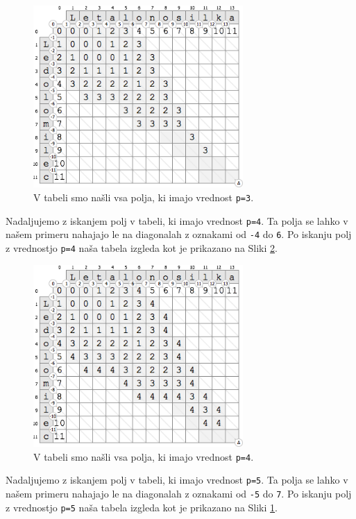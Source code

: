 \documentclass[a4paper, 12pt, twoside]{book}
\begin{document}
\begin{figure}[placement h]
\begin{center}
\includegraphics[width=8cm]{ses6.png}
\end{center}
\caption{V tabeli smo našli vsa polja, ki imajo vrednost {\tt p=3}.}
\label{ses6}
\end{figure}

Nadaljujemo z iskanjem polj v tabeli, ki imajo vrednost {\tt p=4}. Ta polja se lahko v našem primeru nahajajo le na diagonalah z oznakami od {\tt -4} do {\tt 6}. Po iskanju polj z vrednostjo {\tt p=4} naša tabela izgleda kot je prikazano na Sliki \ref{ses7}.

\begin{figure}[placement h]
\begin{center}
\includegraphics[width=8cm]{ses7.png}
\end{center}
\caption{V tabeli smo našli vsa polja, ki imajo vrednost {\tt p=4}.}
\label{ses7}
\end{figure}

\pagebreak

Nadaljujemo z iskanjem polj v tabeli, ki imajo vrednost {\tt p=5}. Ta polja se lahko v našem primeru nahajajo le na diagonalah z oznakami od {\tt -5} do {\tt 7}. Po iskanju polj z vrednostjo {\tt p=5} naša tabela izgleda kot je prikazano na Sliki \ref{ses6}.
\end{document}

